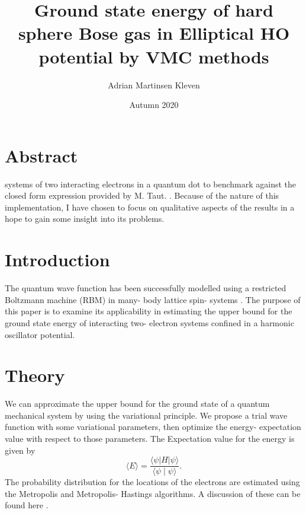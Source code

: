 \documentclass[11pt,a4paper,titlepage]{article}
\title{Ground state energy of hard sphere Bose gas in Elliptical HO potential by VMC methods}
\author{Adrian Martinsen Kleven}
\date{Autumn 2020}
\begin{document}
\maketitle
\tableofcontents
\listoffigures
\listoftables
\clearpage
\section{Abstract}
systems of two interacting electrons in a quantum dot to benchmark against the closed form expression provided by M. Taut. \cite{PhysRevA.48.3561}. Because of the nature of this implementation, I have chosen to focus on qualitative aspects of the results in a hope to gain some insight into its problems.

\section{Introduction}
The quantum wave function has been successfully modelled using a restricted Boltzmann machine (RBM) in many- body lattice spin- systems \cite{Carleo602}. The purpose of this paper is to examine its applicability in estimating the upper bound for the ground state energy of interacting two- electron systems confined in a harmonic oscillator potential.

\section{Theory}
We can approximate the upper bound for the ground state of a quantum mechanical system by using the variational principle. We propose a trial wave function with some variational parameters, then optimize the energy- expectation value with respect to those parameters. The Expectation value for the energy is given by 
\begin{equation}
\langle E\rangle=\frac{\langle\psi|H| \psi\rangle}{\langle\psi \mid \psi\rangle}.
\end{equation}
The probability distribution for the locations of the electrons are estimated using the Metropolis and Metropolis- Hastings algorithms. A discussion of these can be found here \cite{Project1}.
\end{document}

